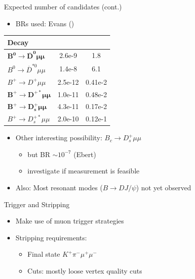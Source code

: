 \documentclass[compress,aspectratio=43]{beamer}
\begin{document}
\begin{frame}[shrink=20]{Expected number of candidates (cont.)}
  \begin{itemize}
    \item BRs used: Evans (\cite{evans1}\cite{evans2})
  \end{itemize}
  \centering
  \begin{tabular}{l S S}
    \toprule
    Decay & {} & {} \\
    \midrule
    $\mathbf{B^0\to \overline{D}^0\mu\mu}$ & 2.6e-9 & 1.8 \\
    $B^0\to \overline{D}^{*0}\mu\mu$ & 1.4e-8 & 6.1 \\
    $B^+\to D^+\mu\mu$ & 2.5e-12 & 0.41e-2 \\
    $\mathbf{B^+\to D^{+*}\mu\mu}$ & 1.0e-11 & 0.48e-2 \\
    $\mathbf{B^+\to D_s^+\mu\mu}$ & 4.3e-11 & 0.17e-2 \\
    $B^+\to D_s^{+*}\mu\mu$ & 2.0e-10 & 0.12e-1 \\
    \bottomrule
  \end{tabular}
  \begin{itemize}
    \item Other interesting possibility: $B_c \to D_s^+\mu\mu$
      \begin{itemize}
        \item but BR $\sim 10^{-7}$ (Ebert\cite{ebert})
        \item investigate if measurement is feasible
      \end{itemize}
    \item Also: Most resonant modes ($B\!\to\! D J/\psi$) not yet observed
  \end{itemize}
\end{frame}

\begin{frame}{Trigger and Stripping}
  \begin{itemize}
    \item Make use of muon trigger strategies
    \item Stripping requirements:
      \begin{itemize}
        \item Final state $K^+\pi^-\mu^+\mu^-$
        \item Cuts: mostly loose vertex quality cuts
      \end{itemize}
  \end{itemize}
\end{frame}
\end{document}

